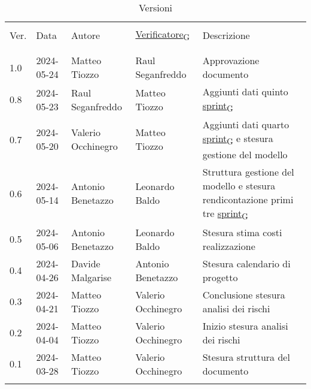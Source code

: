 \documentclass[12pt]{article} %
\begin{document}


\newpage



\begin{table}[!h]
	\footnotesize
	\begin{center}
		\caption*{Versioni}
		\vspace{0.5cm}
		\begin{tabular}{ l l l l p{6cm} }
			\hline                                                                                          \\[-2ex]
			Ver. & Data & Autore & \href{https://7last.github.io/docs/rtb/documentazione-interna/glossario\#verificatore}{Verificatore\textsubscript{G}} & Descrizione \\
			\\[-2ex] \hline \\[-1.5ex]
			1.0 & 2024-05-24 & Matteo Tiozzo & Raul Seganfreddo & Approvazione documento\\
			0.8 & 2024-05-23 & Raul Seganfreddo & Matteo Tiozzo & Aggiunti dati quinto \href{https://7last.github.io/docs/rtb/documentazione-interna/glossario\#sprint}{sprint\textsubscript{G}}\\
			0.7 & 2024-05-20 & Valerio Occhinegro & Matteo Tiozzo & Aggiunti dati quarto \href{https://7last.github.io/docs/rtb/documentazione-interna/glossario\#sprint}{sprint\textsubscript{G}} e stesura gestione del modello \\
			0.6 & 2024-05-14 & Antonio Benetazzo & Leonardo Baldo  & Struttura gestione del modello e stesura rendicontazione primi tre \href{https://7last.github.io/docs/rtb/documentazione-interna/glossario\#sprint}{sprint\textsubscript{G}}  \\
			0.5 & 2024-05-06 & Antonio Benetazzo & Leonardo Baldo & Stesura stima costi realizzazione \\
			0.4 & 2024-04-26 & Davide Malgarise & Antonio Benetazzo & Stesura calendario di progetto \\
			0.3 & 2024-04-21 & Matteo Tiozzo & Valerio Occhinegro & Conclusione stesura analisi dei rischi \\
			0.2 & 2024-04-04 & Matteo Tiozzo & Valerio Occhinegro & Inizio stesura analisi dei rischi \\
			0.1 & 2024-03-28 & Matteo Tiozzo & Valerio Occhinegro & Stesura struttura del documento \\
			\\[-1.5ex] \hline
		\end{tabular}
	\end{center}
\end{table}

\newpage

\tableofcontents

\newpage

\listoftables

\listoffigures

\newpage



\newpage



\newpage



\newpage



\newpage


\end{document}
